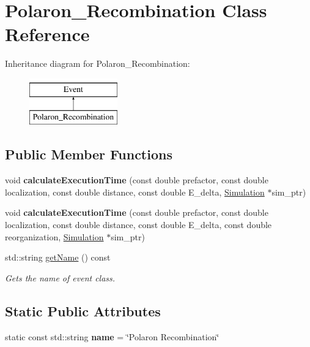 \hypertarget{class_polaron___recombination}{}\section{Polaron\+\_\+\+Recombination Class Reference}
\label{class_polaron___recombination}
Inheritance diagram for Polaron\+\_\+\+Recombination\+:\begin{figure}[H]
\begin{center}
\leavevmode
\includegraphics[height=2.000000cm]{class_polaron___recombination}
\end{center}
\end{figure}
\subsection*{Public Member Functions}
\begin{DoxyCompactItemize}
\item 
\mbox{\label{class_polaron___recombination_ab987d4755177c0a698087c79a1347bfe}} 
void {\bfseries calculate\+Execution\+Time} (const double prefactor, const double localization, const double distance, const double E\+\_\+delta, \hyperlink{class_simulation}{Simulation} $\ast$sim\+\_\+ptr)
\item 
\mbox{\label{class_polaron___recombination_ac7d9302d957a3e3b08d58d5b39332df8}} 
void {\bfseries calculate\+Execution\+Time} (const double prefactor, const double localization, const double distance, const double E\+\_\+delta, const double reorganization, \hyperlink{class_simulation}{Simulation} $\ast$sim\+\_\+ptr)
\item 
std\+::string \hyperlink{class_polaron___recombination_a0075250a377d6fccb8f64e4d173c9041}{get\+Name} () const
\begin{DoxyCompactList}\small\item\em Gets the name of event class. \end{DoxyCompactList}\end{DoxyCompactItemize}
\subsection*{Static Public Attributes}
\begin{DoxyCompactItemize}
\item 
\mbox{\label{class_polaron___recombination_aa7a004a1e87bccff00a28dde96df78ba}} 
static const std\+::string {\bfseries name} = \char`\"{}Polaron Recombination\char`\"{}
\end{DoxyCompactItemize}


